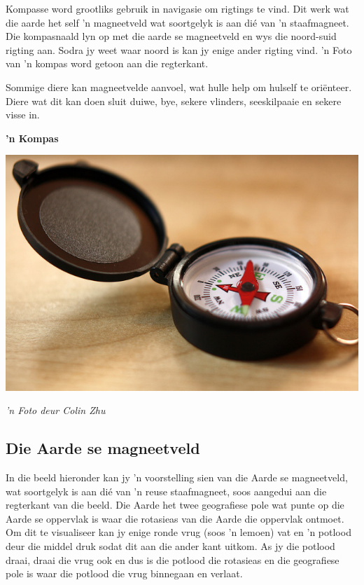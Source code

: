 \begin{minipage}{.5\textwidth}

Kompasse word grootliks gebruik in navigasie om rigtings te vind. Dit werk wat die aarde het self 'n magneetveld wat soortgelyk is aan di\'e van 'n staafmagneet. Die kompasnaald lyn op met die aarde se magneetveld en wys die noord-suid rigting aan. Sodra jy weet waar noord is kan jy enige ander rigting vind. 'n Foto van 'n kompas word getoon aan die regterkant.\par

Sommige diere kan magneetvelde aanvoel, wat hulle help om hulself te ori\"enteer. Diere wat dit kan doen sluit duiwe, bye, sekere vlinders, seeskilpaaie en sekere visse in. \par
     
\end{minipage}
\begin{minipage}{.5\textwidth}
\begin{center}
\textbf{'n Kompas}\par
\includegraphics[width=.8\textwidth]{photos/Colin_ZHU.jpg}\par
\textit{'n Foto deur Colin Zhu}
\end{center}
\end{minipage}
            

\subsection*{Die Aarde se magneetveld}
            \nopagebreak
In die beeld hieronder kan jy 'n voorstelling sien van die Aarde se magneetveld, wat soortgelyk is aan di\'e van 'n reuse staafmagneet, soos aangedui aan die regterkant van die beeld. Die Aarde het twee geografiese pole wat punte op die Aarde se oppervlak is waar die rotasieas van die Aarde die oppervlak ontmoet. Om dit te visualiseer kan jy enige ronde vrug (soos 'n lemoen) vat en 'n potlood deur  die middel druk sodat dit aan die ander kant uitkom. As jy die potlood draai, draai die vrug ook en dus is die potlood die rotasieas en die geografiese pole is waar die potlood die vrug binnegaan en verlaat.


